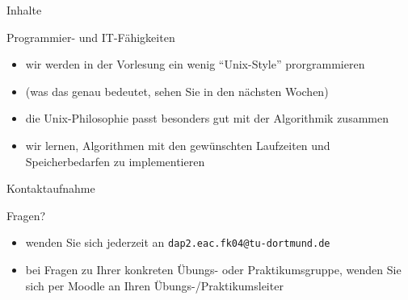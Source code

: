 \documentclass[aspectratio=1610, 11pt]{beamer}
\begin{document}
\begin{frame}{Inhalte}
	\begin{exampleblock}{Programmier- und IT-F\"ahigkeiten}
		\begin{itemize}
			\item wir werden in der Vorlesung ein wenig ``Unix-Style'' prorgrammieren
			\item (was das genau bedeutet, sehen Sie in den n\"achsten Wochen)
			\item die Unix-Philosophie passt besonders gut mit der Algorithmik zusammen
			\item wir lernen, Algorithmen mit den gew\"unschten Laufzeiten und Speicherbedarfen zu implementieren
		\end{itemize}
	\end{exampleblock}
\end{frame}

\begin{frame}{Kontaktaufnahme}
	\begin{exampleblock}{Fragen?}
		\begin{itemize}
		\item wenden Sie sich jederzeit an {\tt dap2.eac.fk04@tu-dortmund.de}
			\item bei Fragen zu Ihrer konkreten \"Ubungs- oder Praktikumsgruppe, wenden Sie sich per Moodle an Ihren \"Ubungs-/Praktikumsleiter
		\end{itemize}
	\end{exampleblock}
\end{frame}
\end{document}
